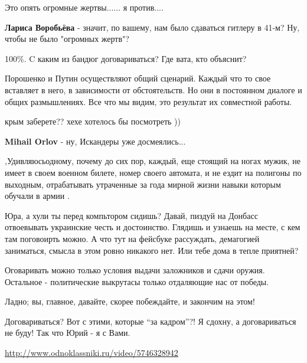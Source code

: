 \begin{itemize}
Это опять огромные жертвы...... я против....

\textbf{Лариса Воробьёва} - значит, по вашему, нам было сдаваться гитлеру в 41-м? Ну, чтобы не было "огромных жертв"?

100\%. C каким из бандюг договариваться? Где вата, кто объяснит?


Порошенко и Путин осуществляют общий сценарий. Каждый что то свое вставляет в
него, в зависимости от обстоятельств. Но они в постоянном диалоге и общих
размышлениях. Все что мы видим, это результат их совместной работы.


крым заберете?? хехе хотелось бы посмотреть ))

\textbf{Mihail Orlov} - ну, Искандеры уже досмеялись...


,Удивляюсьодному, почему до сих пор, каждый, еще стоящий на ногах мужик, не
имеет в своем военном билете, номер своего автомата, и не ездит на полигоны по
выходным, отрабатывать утраченные за года мирной жизни навыки которым обучали в
армии .


Юра, а хули ты перед компьтором сидишь? Давай, пиздуй на Донбасс отвоевывать
украинские честь и достоинство. Глядишь и узнаешь на месте, с кем там
поговоирть можно. А что тут на фейсбуке рассуждать, демагогией заниматься,
смысла в этом ровно никакого нет. Или тебе дома в тепле приятней?


Оговаривать можно только условия выдачи заложников и сдачи оружия. Остальное -
политические выкрутасы только отдаляющие нас от победы.


Ладно; вы, главное, давайте, скорее побеждайте, и закончим на этом!


Договариваться? Вот с этими, которые \enquote{за кадром}?! Я сдохну, а договариваться
не буду! Так что Юрий - я с Вами.

\url{http://www.odnoklassniki.ru/video/5746328942}

\begin{multicols}{2}



\end{multicols}
\end{itemize}
